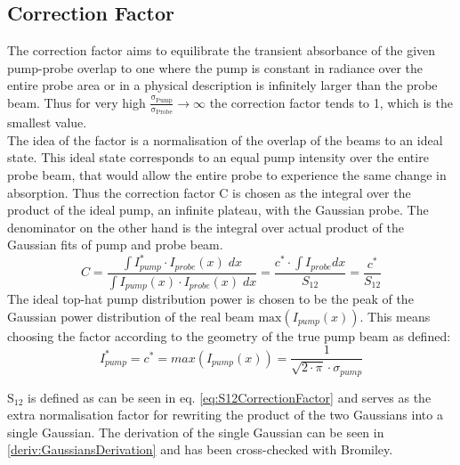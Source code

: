 \documentclass[twoside,openright]{scrreprt}
\begin{document}
\subsection{Correction Factor}\label{sec:CorrFactor}
The correction factor aims to equilibrate the transient absorbance of the given pump-probe overlap to one where the pump is constant in radiance over the entire probe area or in a physical description is infinitely larger than the probe beam. 
Thus for very high $\mathrm{\frac{\sigma_{Pump}}{\sigma_{Probe}} \rightarrow \infty}$ the correction factor tends to 1, which is the smallest value.\\
The idea of the factor is a normalisation of the overlap of the beams to an ideal state. This ideal state corresponds to an equal pump intensity over the entire probe beam, that would allow the entire probe to experience the same change in absorption. Thus the correction factor C is chosen as the integral over the product of the ideal pump, an infinite plateau, with the Gaussian probe. The denominator on the other hand is the integral over actual product of the Gaussian fits of pump and probe beam.
\begin{equation}\label{eq:CorrFactorGaussians}
C = \dfrac{\int I_{pump}^*\cdot I_{probe}(x) \;dx}{\int I_{pump}(x)\cdot I_{probe}(x) \; dx} = \dfrac{c^*\cdot \int I_{probe} dx}{S_{12}} = \dfrac{c^*}{S_{12}}
\end{equation}
The ideal top-hat pump distribution power is chosen to be the peak of the Gaussian power distribution of the real beam $\mathrm{max}\left(I_{pump}(x)\right)$. This means choosing the factor according to the geometry of the true pump beam as defined:
\begin{equation*}\label{eq:maxPowerGauss}
I_{pump}^* = c^* = max(I_{pump}(x)) = \frac{1}{\sqrt{2\cdot\pi}\cdot\sigma_{pump}}
\end{equation*}

$\mathrm{S_{12}}$ is defined as can be seen in eq. \ref{eq:S12CorrectionFactor} and serves as the extra normalisation factor for rewriting the product of the two Gaussians into a single Gaussian. The derivation of the single Gaussian can be seen in \ref{deriv:GaussiansDerivation} and has been cross-checked with Bromiley.\cite{Bromiley2014}
\end{document}
